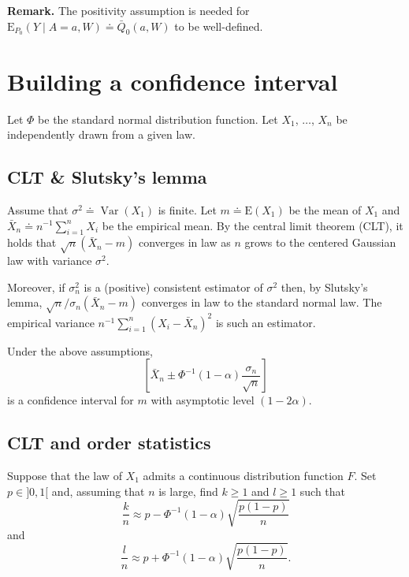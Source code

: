 \documentclass[11pt,openright,twoside]{book}
\DeclareMathOperator{\Var}{Var}
\newcommand{\defq}{\doteq}
\newcommand{\Exp}{\textrm{E}}
\newcommand{\Qbar}{\bar{Q}}
\theoremstyle{definition}
\theoremstyle{definition}
\theoremstyle{definition}
\theoremstyle{remark}
\let\BeginKnitrBlock\begin \let\EndKnitrBlock\end
\begin{document}
\textbf{Remark.} The positivity assumption is needed for \(\Exp_{P_0}(Y \mid A = a, W) \defq \Qbar_{0}(a,W)\) to be well-defined.

\hypertarget{confidence-interval}{%
\section{Building a confidence interval}\label{confidence-interval}}

Let \(\Phi\) be the standard normal distribution function. Let \(X_{1}\),
\(\ldots\), \(X_{n}\) be independently drawn from a given law.

\hypertarget{clt}{%
\subsection{CLT \& Slutsky's lemma}\label{clt}}

Assume that \(\sigma^{2} \defq \Var(X_{1})\) is finite. Let \(m \defq \Exp(X_{1})\) be the mean of \(X_{1}\) and \(\bar{X}_{n} \defq n^{-1} \sum_{i=1}^{n} X_{i}\) be the empirical mean. By the central limit theorem
(CLT), it holds that \(\sqrt{n} (\bar{X}_{n} - m)\) converges in law as \(n\)
grows to the centered Gaussian law with variance \(\sigma^{2}\).

Moreover, if \(\sigma_{n}^{2}\) is a (positive) consistent estimator of
\(\sigma^{2}\) then, by Slutsky's lemma, \(\sqrt{n}/\sigma_{n} (\bar{X}_{n} - m)\)
converges in law to the standard normal law. The empirical variance \(n^{-1} \sum_{i=1}^{n}(X_{i} - \bar{X}_{n})^{2}\) is such an estimator.

\BeginKnitrBlock{proposition}
\protect\hypertarget{prp:unnamed-chunk-4}{}{\label{prp:unnamed-chunk-4} }Under the above assumptions, \begin{equation*}  \left[\bar{X}_{n}   \pm
\Phi^{-1}(1-\alpha)  \frac{\sigma_{n}}{\sqrt{n}}\right]  \end{equation*} is a
confidence interval for \(m\) with asymptotic level \((1-2\alpha)\).
\EndKnitrBlock{proposition}

\hypertarget{order}{%
\subsection{CLT and order statistics}\label{order}}

Suppose that the law of \(X_{1}\) admits a continuous distribution function
\(F\). Set \(p \in ]0,1[\) and, assuming that \(n\) is large, find \(k\geq 1\) and \(l \geq 1\) such that \begin{equation*}   \frac{k}{n}   \approx    p   -
\Phi^{-1}(1-\alpha)      \sqrt{\frac{p(1-p)}{n}}      \end{equation*} and
\begin{equation*}    \frac{l}{n}     \approx    p     +    \Phi^{-1}(1-\alpha)
\sqrt{\frac{p(1-p)}{n}}.  \end{equation*}
\end{document}
